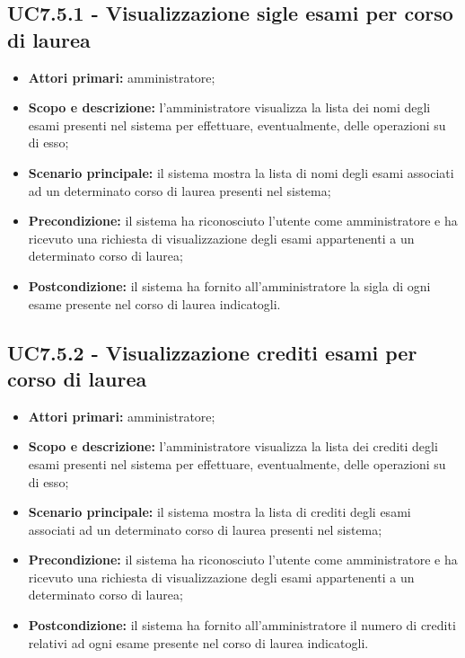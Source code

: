 \documentclass[AnalisiDeiRequisiti.tex]{subfiles}
\begin{document}
\subsection{UC7.5.1 - Visualizzazione sigle esami per corso di laurea}
\begin{itemize}
	\item \textbf{Attori primari:} amministratore;
	\item \textbf{Scopo e descrizione:} l'amministratore visualizza la lista dei nomi degli esami presenti nel sistema per effettuare, eventualmente, delle operazioni su di esso;
	\item \textbf{Scenario principale:} il sistema mostra la lista di nomi degli esami associati ad un determinato corso di laurea presenti nel sistema;
	\item \textbf{Precondizione:} il sistema ha riconosciuto l'utente come amministratore e ha ricevuto una richiesta di visualizzazione degli esami appartenenti a un determinato corso di laurea; 
	\item \textbf{Postcondizione:} il sistema ha fornito all'amministratore la sigla di ogni esame presente nel corso di laurea indicatogli.
\end{itemize}
\subsection{UC7.5.2 - Visualizzazione crediti esami per corso di laurea}
\begin{itemize}
	\item \textbf{Attori primari:} amministratore;
	\item \textbf{Scopo e descrizione:} l'amministratore visualizza la lista dei crediti degli esami presenti nel sistema per effettuare, eventualmente, delle operazioni su di esso;
	\item \textbf{Scenario principale:} il sistema mostra la lista di crediti degli esami associati ad un determinato corso di laurea presenti nel sistema;
	\item \textbf{Precondizione:} il sistema ha riconosciuto l'utente come amministratore e ha ricevuto una richiesta di visualizzazione degli esami appartenenti a un determinato corso di laurea; 
	\item \textbf{Postcondizione:} il sistema ha fornito all'amministratore il numero di crediti relativi ad ogni esame presente nel corso di laurea indicatogli.
\end{itemize}
\end{document}
